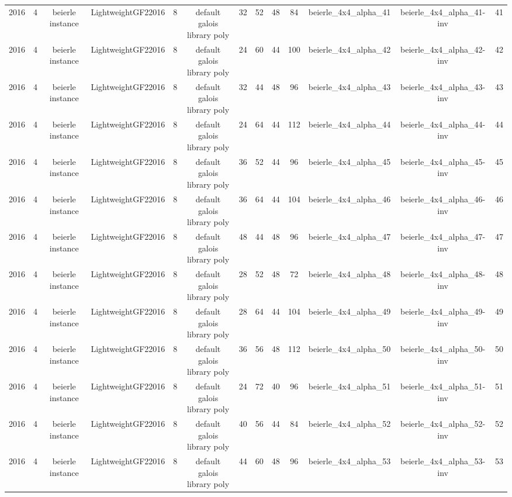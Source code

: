 \begin{tabular}{c c c c c c c c c c c c c}
2016 & 4 & beierle instance & LightweightGF22016 & 8 & default galois library poly & 32 & 52 & 48 & 84 & beierle_4x4_alpha_41 & beierle_4x4_alpha_41-inv & 41 \\
2016 & 4 & beierle instance & LightweightGF22016 & 8 & default galois library poly & 24 & 60 & 44 & 100 & beierle_4x4_alpha_42 & beierle_4x4_alpha_42-inv & 42 \\
2016 & 4 & beierle instance & LightweightGF22016 & 8 & default galois library poly & 32 & 44 & 48 & 96 & beierle_4x4_alpha_43 & beierle_4x4_alpha_43-inv & 43 \\
2016 & 4 & beierle instance & LightweightGF22016 & 8 & default galois library poly & 24 & 64 & 44 & 112 & beierle_4x4_alpha_44 & beierle_4x4_alpha_44-inv & 44 \\
2016 & 4 & beierle instance & LightweightGF22016 & 8 & default galois library poly & 36 & 52 & 44 & 96 & beierle_4x4_alpha_45 & beierle_4x4_alpha_45-inv & 45 \\
2016 & 4 & beierle instance & LightweightGF22016 & 8 & default galois library poly & 36 & 64 & 44 & 104 & beierle_4x4_alpha_46 & beierle_4x4_alpha_46-inv & 46 \\
2016 & 4 & beierle instance & LightweightGF22016 & 8 & default galois library poly & 48 & 44 & 48 & 96 & beierle_4x4_alpha_47 & beierle_4x4_alpha_47-inv & 47 \\
2016 & 4 & beierle instance & LightweightGF22016 & 8 & default galois library poly & 28 & 52 & 48 & 72 & beierle_4x4_alpha_48 & beierle_4x4_alpha_48-inv & 48 \\
2016 & 4 & beierle instance & LightweightGF22016 & 8 & default galois library poly & 28 & 64 & 44 & 104 & beierle_4x4_alpha_49 & beierle_4x4_alpha_49-inv & 49 \\
2016 & 4 & beierle instance & LightweightGF22016 & 8 & default galois library poly & 36 & 56 & 48 & 112 & beierle_4x4_alpha_50 & beierle_4x4_alpha_50-inv & 50 \\
2016 & 4 & beierle instance & LightweightGF22016 & 8 & default galois library poly & 24 & 72 & 40 & 96 & beierle_4x4_alpha_51 & beierle_4x4_alpha_51-inv & 51 \\
2016 & 4 & beierle instance & LightweightGF22016 & 8 & default galois library poly & 40 & 56 & 44 & 84 & beierle_4x4_alpha_52 & beierle_4x4_alpha_52-inv & 52 \\
2016 & 4 & beierle instance & LightweightGF22016 & 8 & default galois library poly & 44 & 60 & 48 & 96 & beierle_4x4_alpha_53 & beierle_4x4_alpha_53-inv & 53 \\

\end{tabular}
